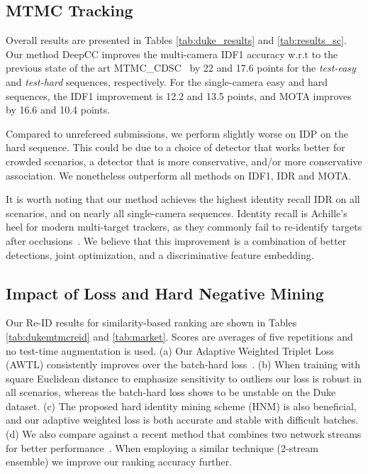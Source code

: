 \documentclass[10pt,twocolumn,letterpaper]{article}
\begin{document}
\subsection{MTMC Tracking}

Overall results are presented in Tables \ref{tab:duke_results} and \ref{tab:results_sc}. Our method DeepCC improves the multi-camera IDF1 accuracy w.r.t to the previous state of the art MTMC\_CDSC~\cite{tesfaye2017multi} by 22 and 17.6 points for the \textit{test-easy} and \textit{test-hard} sequences, respectively. For the single-camera easy and hard sequences, the IDF1 improvement is 12.2 and 13.5 points, and MOTA improves by 16.6 and 10.4 points. 

Compared to unrefereed submissions, we perform slightly worse on IDP on the hard sequence. This could be due to a choice of detector that works better for crowded scenarios, a detector that is more conservative, and/or more conservative association. We nonetheless outperform all methods on IDF1, IDR and MOTA.

It is worth noting that our method achieves the highest identity recall IDR on all scenarios, and on nearly all single-camera sequences. Identity recall is Achille's heel for modern multi-target trackers, as they commonly fail to re-identify targets after occlusions~\cite{leal2017tracking}. We believe that this improvement is a combination of better detections, joint optimization, and a discriminative feature embedding.

\subsection{Impact of Loss and Hard Negative Mining}

Our Re-ID results for similarity-based ranking are shown in Tables \ref{tab:dukemtmcreid} and \ref{tab:market}. Scores are averages of five repetitions and no test-time augmentation is used. (a) Our Adaptive Weighted Triplet Loss (AWTL) consistently improves over the batch-hard loss~\cite{hermans2017defense, mishchuk2017working}. (b) When training with square Euclidean distance to emphasize sensitivity to outliers our loss is robust in all scenarios, whereas the batch-hard loss shows to be unstable on the Duke dataset. (c) The proposed hard identity mining scheme (HNM) is also beneficial, and our adaptive weighted loss is both accurate and stable with difficult batches. (d) We also compare against a recent method that combines two network streams for better performance~\cite{chen2017person}. When employing a similar technique (2-stream ensemble) we improve our ranking accuracy further.  
\end{document}
